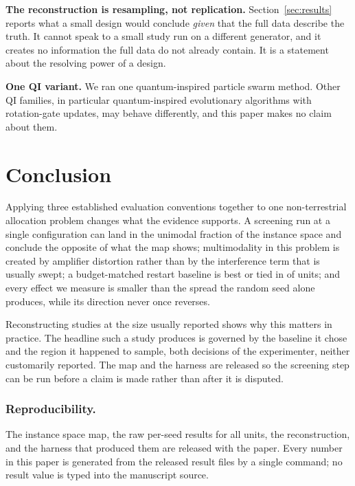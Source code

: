 \documentclass[runningheads]{llncs}
\begin{document}
\textbf{The reconstruction is resampling, not replication.} Section~\ref{sec:results} reports what
a small design would conclude \emph{given} that the full data describe the truth. It cannot speak
to a small study run on a different generator, and it creates no information the full data do not
already contain. It is a statement about the resolving power of a design.

\textbf{One QI variant.} We ran one quantum-inspired particle swarm method. Other QI families, in
particular quantum-inspired evolutionary algorithms with rotation-gate updates, may behave
differently, and this paper makes no claim about them.

\section{Conclusion}

Applying three established evaluation conventions together to one non-terrestrial allocation
problem changes what the evidence supports. A screening run at a single configuration can land in
the unimodal fraction of the instance space and conclude the opposite of what the map shows;
multimodality in this problem is created by amplifier distortion rather than by the interference
term that is usually swept; a budget-matched restart baseline is best or tied in
\numRestartBest{} of \numUnits{} units; and every effect we measure is smaller than the spread
the random seed alone produces, while its direction never once reverses.

Reconstructing \numStudies{} studies at the size usually reported shows why this matters in
practice. The headline such a study produces is governed by the baseline it chose and the region
it happened to sample, both decisions of the experimenter, neither customarily reported. The map
and the harness are released so the screening step can be run before a claim is made rather than
after it is disputed.

\subsubsection*{Reproducibility.} The instance space map, the raw per-seed results for all
\numUnits{} units, the reconstruction, and the harness that produced them are released with the
paper. Every number in this paper is generated from the released result files by a single
command; no result value is typed into the manuscript source.
\end{document}

